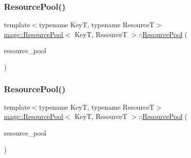 \subsubsection{\texorpdfstring{Resource\+Pool()}{ResourcePool()}\hspace{0.1cm}{\footnotesize\ttfamily [2/3]}}
{\footnotesize\ttfamily template$<$typename KeyT, typename ResourceT$>$ \\
\hyperlink{classmage_1_1_resource_pool}{mage\+::\+Resource\+Pool}$<$ KeyT, ResourceT $>$\+::\hyperlink{classmage_1_1_resource_pool}{Resource\+Pool} (\begin{DoxyParamCaption}\item[{const \hyperlink{classmage_1_1_resource_pool}{Resource\+Pool}$<$ KeyT, ResourceT $>$ \&}]{resource\+\_\+pool }\end{DoxyParamCaption})\hspace{0.3cm}{\ttfamily [delete]}}

\hypertarget{classmage_1_1_resource_pool_adea88e0bead1af27e39a3412527122f3}{}\label{classmage_1_1_resource_pool_adea88e0bead1af27e39a3412527122f3} 
\subsubsection{\texorpdfstring{Resource\+Pool()}{ResourcePool()}\hspace{0.1cm}{\footnotesize\ttfamily [3/3]}}
{\footnotesize\ttfamily template$<$typename KeyT, typename ResourceT$>$ \\
\hyperlink{classmage_1_1_resource_pool}{mage\+::\+Resource\+Pool}$<$ KeyT, ResourceT $>$\+::\hyperlink{classmage_1_1_resource_pool}{Resource\+Pool} (\begin{DoxyParamCaption}\item[{\hyperlink{classmage_1_1_resource_pool}{Resource\+Pool}$<$ KeyT, ResourceT $>$ \&\&}]{resource\+\_\+pool }\end{DoxyParamCaption})\hspace{0.3cm}{\ttfamily [default]}}

\hypertarget{classmage_1_1_resource_pool_ae4fff3d951818d417f77965c2db265f6}{}\label{classmage_1_1_resource_pool_ae4fff3d951818d417f77965c2db265f6} 
